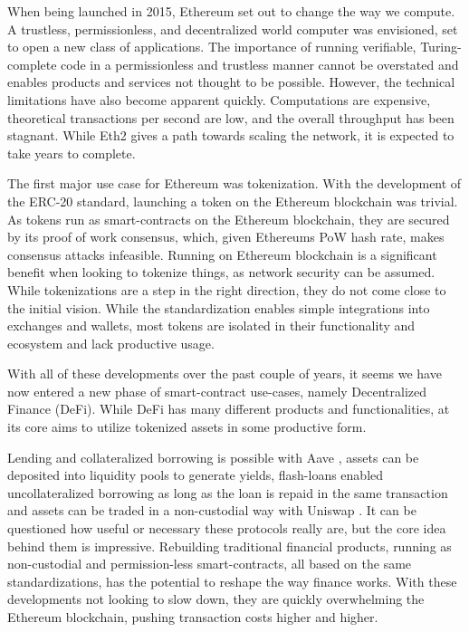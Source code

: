 \documentclass[../../thesis.tex]{subfiles}
\begin{document}
When being launched in 2015, Ethereum \cite{wood2014ethereum} set out to change the way we compute. A trustless, permissionless, and decentralized world computer was envisioned, set to open a new class of applications. The importance of running verifiable, Turing-complete code in a permissionless and trustless manner cannot be overstated and enables products and services not thought to be possible. However, the technical limitations have also become apparent quickly. Computations are expensive, theoretical transactions per second are low, and the overall throughput has been stagnant. While Eth2 gives a path towards scaling the network, it is expected to take years to complete. 

The first major use case for Ethereum was tokenization. With the development of the ERC-20 standard, launching a token on the Ethereum blockchain was trivial. As tokens run as smart-contracts on the Ethereum blockchain, they are secured by its proof of work consensus, which, given Ethereums PoW hash rate, makes consensus attacks infeasible. Running on Ethereum blockchain is a significant benefit when looking to tokenize things, as network security can be assumed. While tokenizations are a step in the right direction, they do not come close to the initial vision. While the standardization enables simple integrations into exchanges and wallets, most tokens are isolated in their functionality and ecosystem and lack productive usage.

With all of these developments over the past couple of years, it seems we have now entered a new phase of smart-contract use-cases, namely Decentralized Finance (DeFi). While DeFi has many different products and functionalities, at its core aims to utilize tokenized assets in some productive form. 


Lending and collateralized borrowing is possible with Aave \cite{kulechov_2020}, assets can be deposited into liquidity pools\cite{adams2020uniswap} to generate yields, flash-loans \cite{kulechov_2020}\cite{adams2020uniswap} enabled uncollateralized borrowing as long as the loan is repaid in the same transaction and assets can be traded in a non-custodial way with Uniswap \cite{adams2020uniswap} . It can be questioned how useful or necessary these protocols really are, but the core idea behind them is impressive. Rebuilding traditional financial products, running as non-custodial and permission-less smart-contracts, all based on the same standardizations, has the potential to reshape the way finance works. With these developments not looking to slow down, they are quickly overwhelming the Ethereum blockchain, pushing transaction costs \cite{gasprice} higher and higher. 
\end{document}
